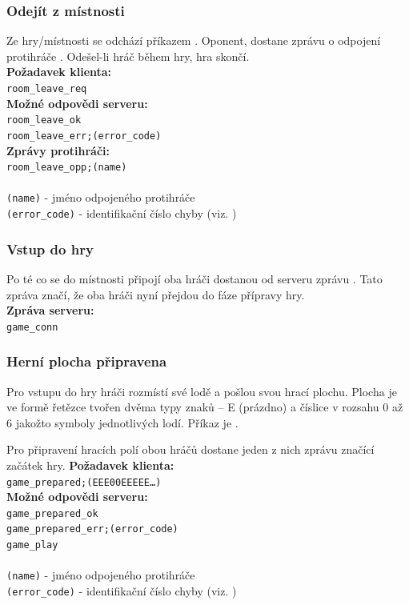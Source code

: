 \documentclass[12pt, a4paper]{article} %
\begin{document}
	\subsubsection{Odejít z místnosti}
	\par Ze hry/místnosti se odchází příkazem . Oponent, dostane zprávu o odpojení protihráče . Odešel-li hráč během hry, hra skončí.\\
	\textbf{Požadavek klienta:}\\
	\texttt{room\_leave\_req}\\
	\textbf{Možné odpovědi serveru:}\\
	\texttt{room\_leave\_ok}\\
	\texttt{room\_leave\_err;(error\_code)}\\
	\textbf{Zprávy protihráči:}\\
	\texttt{room\_leave\_opp;(name)}\\\\
	\texttt{(name)} - jméno odpojeného protihráče\\
	\texttt{(error\_code)} - identifikační číslo chyby (viz. )
	\subsubsection{Vstup do hry}
	\par Po té co se do místnosti připojí oba hráči dostanou od serveru zprávu . Tato zpráva značí, že oba hráči nyní přejdou do fáze přípravy hry.\\
	\textbf{Zpráva serveru:}\\
	\texttt{game\_conn}
	\subsubsection{Herní plocha připravena}
	\label{ssec:game_ready}
	\par Pro vstupu do hry hráči rozmístí své lodě a pošlou svou hrací plochu. Plocha je ve formě řetězce tvořen dvěma typy znaků – E (prázdno) a číslice v rozsahu 0 až 6 jakožto symboly jednotlivých lodí. Příkaz je .
	\par Pro připravení hracích polí obou hráčů dostane jeden z nich zprávu  značící začátek hry.
	\textbf{Požadavek klienta:}\\
	\texttt{game\_prepared;(EEE00EEEEE…)}\\
	\textbf{Možné odpovědi serveru:}\\
	\texttt{game\_prepared\_ok}\\
	\texttt{game\_prepared\_err;(error\_code)}\\
	\texttt{game\_play}\\\\
	\texttt{(name)} - jméno odpojeného protihráče\\
	\texttt{(error\_code)} - identifikační číslo chyby (viz. )
		
\end{document}
